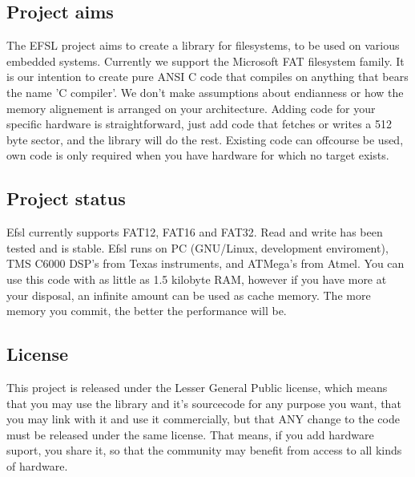 \subsection{Project aims}
The EFSL project aims to create a library for filesystems, to be used on 
various embedded systems. Currently we support the Microsoft FAT filesystem 
family. It is our intention to create pure ANSI C code that compiles on 
anything that bears the name 'C compiler'. We don't make assumptions about 
endianness or how the memory alignement is arranged on your architecture.
\newline\newline
Adding code for your specific hardware is straightforward, just add code that 
fetches or writes a 512 byte sector, and the library will do the rest. 
Existing code can offcourse be used, own code is only required when you 
have hardware for which no target exists. 
\subsection{Project status}
Efsl currently supports FAT12, FAT16 and FAT32. Read and write has been tested 
and is stable. Efsl runs on PC (GNU/Linux, development enviroment), 
TMS C6000 DSP's from Texas instruments, and ATMega's from Atmel.
You can use this code with as little as 1.5 kilobyte RAM, however if you have 
more at your disposal, an infinite amount can be used as cache memory. 
The more memory you commit, the better the performance will be.
\subsection{License}
This project is released under the Lesser General Public license, which 
means that you may use the library and it's sourcecode for any purpose you want, 
that you may link with it and use it commercially, but that ANY change to the 
code must be released under the same license. That means, if you add hardware 
suport, you share it, so that the community may benefit from access to all 
kinds of hardware.
